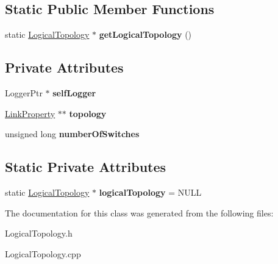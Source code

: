 \subsection*{\-Static \-Public \-Member \-Functions}
\begin{DoxyCompactItemize}
\item 
\hypertarget{classLogicalTopology_a702bc1771d9af9ff924ceafc8b38f81b}{static \hyperlink{classLogicalTopology}{\-Logical\-Topology} $\ast$ {\bfseries get\-Logical\-Topology} ()}\label{classLogicalTopology_a702bc1771d9af9ff924ceafc8b38f81b}

\end{DoxyCompactItemize}
\subsection*{\-Private \-Attributes}
\begin{DoxyCompactItemize}
\item 
\hypertarget{classLogicalTopology_ac123be3e59d153f483df3127d8c1d228}{\-Logger\-Ptr $\ast$ {\bfseries self\-Logger}}\label{classLogicalTopology_ac123be3e59d153f483df3127d8c1d228}

\item 
\hypertarget{classLogicalTopology_ac41fba32bace34bfd5db97f8e7592f54}{\hyperlink{structLogicalTopology_1_1LinkProperty}{\-Link\-Property} $\ast$$\ast$ {\bfseries topology}}\label{classLogicalTopology_ac41fba32bace34bfd5db97f8e7592f54}

\item 
\hypertarget{classLogicalTopology_a0428a53fe5f480570166717bf83e3011}{unsigned long {\bfseries number\-Of\-Switches}}\label{classLogicalTopology_a0428a53fe5f480570166717bf83e3011}

\end{DoxyCompactItemize}
\subsection*{\-Static \-Private \-Attributes}
\begin{DoxyCompactItemize}
\item 
\hypertarget{classLogicalTopology_ad2a75efd16e85a5d4032adf17532bba1}{static \hyperlink{classLogicalTopology}{\-Logical\-Topology} $\ast$ {\bfseries logical\-Topology} = \-N\-U\-L\-L}\label{classLogicalTopology_ad2a75efd16e85a5d4032adf17532bba1}

\end{DoxyCompactItemize}


\-The documentation for this class was generated from the following files\-:\begin{DoxyCompactItemize}
\item 
\-Logical\-Topology.\-h\item 
\-Logical\-Topology.\-cpp\end{DoxyCompactItemize}
